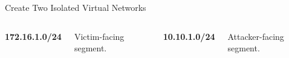 \begin{frame}{Create Two Isolated Virtual Networks}
  \begin{columns}[T,onlytextwidth]
      {\color{ResearchColor}\fontsize{19}{23}\selectfont\bfseries 172.16.1.0/24\par}
      \vspace{0.3cm}Victim-facing segment.
      {\color{ResearchColor}\fontsize{19}{23}\selectfont\bfseries 10.10.1.0/24\par}
      \vspace{0.3cm}Attacker-facing segment.
  \end{columns}
\end{frame}
